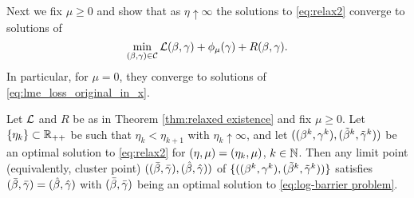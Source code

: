 Next we fix $\mu\ge 0$ and show that as 
$\eta\uparrow\infty$ the solutions to 
\eqref{eq:relax2} converge to solutions of
\begin{equation}\label{eq:log-barrier problem}
\min_{(\beta,\gamma)\in\mathcal{C}}\operatorname{\mathcal{L}}(\beta,\gamma)+\phi_\mu(\gamma)+R(\beta,\gamma).
\end{equation}
In particular, for $\mu=0$, they converge to solutions of 
\eqref{eq:lme_loss_original_in_x}.

\begin{theorem}\label{thm:eta consistency}
Let $\operatorname{\mathcal{L}}$ and $R$ be as in Theorem \ref{thm:relaxed existence}
and fix $\mu\ge 0$.
Let $\{\eta_k\}\subset\operatorname{\mathbb{R}}_{++}$ be such that $\eta_k<\eta_{k+1}$
with $\eta_k\uparrow\infty$, and let $((\beta^k,\gamma^k),(\tilde\beta^k,{\tilde{\gamma}}^k))$ be an optimal solution to 
\eqref{eq:relax2} for $({\eta,\mu})=(\eta_k,\mu)$, $k\in\operatorname{\mathbb{N}}$.
Then any limit point (equivalently, cluster point) 
$((\bar\beta,\bar{\gamma}),(\hat\beta,\hat{\gamma}))$ of $\{((\beta^k,\gamma^k),(\tilde\beta^k,{\tilde{\gamma}}^k))\}$ satisfies
$(\bar\beta,\bar{\gamma})=(\hat\beta,\hat{\gamma})$ with $(\bar\beta,\bar{\gamma})$ being an optimal solution to 
\eqref{eq:log-barrier problem}.
\end{theorem}
